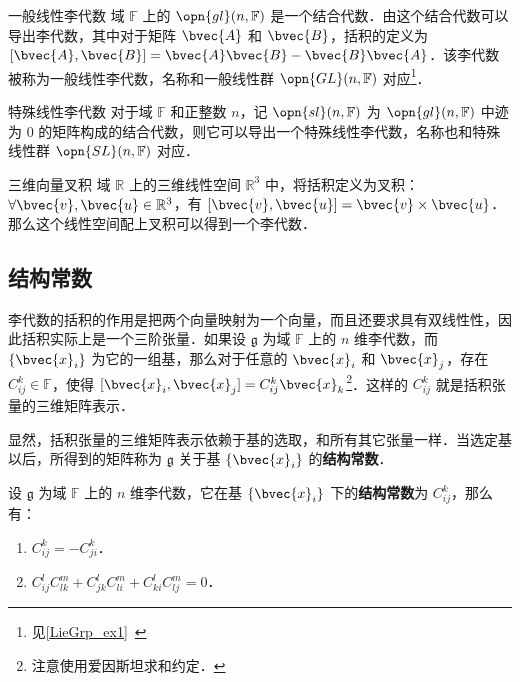 \begin{example}{一般线性李代数}
域 $\mathbb{F}$ 上的 $\opn{gl}(n, \mathbb{F})$ 是一个结合代数．由这个结合代数可以导出李代数，其中对于矩阵 $\bvec{A}$ 和 $\bvec{B}$，括积的定义为 $[\bvec{A}, \bvec{B}]=\bvec{A}\bvec{B}-\bvec{B}\bvec{A}$．该李代数被称为一般线性李代数，名称和一般线性群 $\opn{GL}(n, \mathbb{F})$ 对应\footnote{见\autoref{LieGrp_ex1}~}．
\end{example}

\begin{example}{特殊线性李代数}
对于域 $\mathbb{F}$ 和正整数 $n$，记 $\opn{sl}(n, \mathbb{F})$ 为 $\opn{gl}(n, \mathbb{F})$ 中迹为 $0$ 的矩阵构成的结合代数，则它可以导出一个特殊线性李代数，名称也和特殊线性群 $\opn{SL}(n, \mathbb{F})$ 对应．
\end{example}

\begin{example}{三维向量叉积}\label{LieAlg_ex1}
域 $\mathbb{R}$ 上的三维线性空间 $\mathbb{R}^3$ 中，将括积定义为叉积：$\forall \bvec{v}, \bvec{u}\in \mathbb{R}^3$，有 $[\bvec{v}, \bvec{u}]=\bvec{v}\times\bvec{u}$．那么这个线性空间配上叉积可以得到一个李代数．
\end{example}

\subsection{结构常数}

李代数的括积的作用是把两个向量映射为一个向量，而且还要求具有双线性性，因此括积实际上是一个三阶张量．如果设 $\mathfrak{g}$ 为域 $\mathbb{F}$ 上的 $n$ 维李代数，而 $\{\bvec{x}_i\}$ 为它的一组基，那么对于任意的 $\bvec{x}_i$ 和 $\bvec{x}_j$，存在 $C^k_{ij}\in\mathbb{F}$，使得 $[\bvec{x}_i, \bvec{x}_j]=C^k_{ij}\bvec{x}_k$\footnote{注意使用爱因斯坦求和约定．}．这样的 $C^k_{ij}$ 就是括积张量的三维矩阵表示．

显然，括积张量的三维矩阵表示依赖于基的选取，和所有其它张量一样．当选定基以后，所得到的矩阵称为 $\mathfrak{g}$ 关于基 $\{\bvec{x}_i\}$ 的\textbf{结构常数}．

\begin{theorem}{}\label{LieAlg_the1}
设 $\mathfrak{g}$ 为域 $\mathbb{F}$ 上的 $n$ 维李代数，它在基 $\{\bvec{x}_i\}$ 下的\textbf{结构常数}为 $C^k_{ij}$，那么有：
\begin{enumerate}
\item $C^k_{ij}=-C^k_{ji}$．
\item $C^l_{ij}C^m_{lk}+C^l_{jk}C^m_{li}+C^l_{ki}C^m_{lj}=0$．
\end{enumerate}
\end{theorem}

